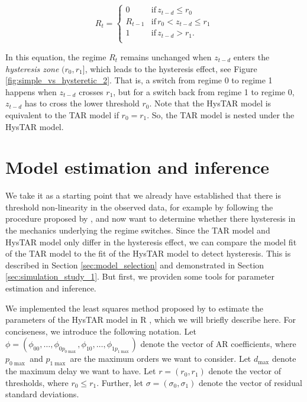 \documentclass{article}
\begin{document}
\begin{equation} \label{eqn:hysteretic_switching}
R_t = \begin{cases}
0 & \mathrm{if} \, z_{t-d} \le r_0 \\
R_{t-1} & \mathrm{if} \, r_0 < z_{t-d} \le r_1 \\
1 & \mathrm{if} \, z_{t-d} > r_1. \\
\end{cases}
\end{equation}

In this equation, the regime $R_t$ remains unchanged when $z_{t-d}$ enters the \textit{hysteresis zone} $(r_0, r_1]$, which leads to the hysteresis effect, see Figure \ref{fig:simple_vs_hysteretic_2}. 
That is, a switch from regime 0 to regime 1 happens when $z_{t-d}$ crosses $r_1$, but for a switch back from regime 1 to regime 0, $z_{t-d}$ has to cross the lower threshold $r_0$.
Note that the HysTAR model is equivalent to the TAR model if $r_0 = r_1$. So, the TAR model is nested under the HysTAR model.

\section{Model estimation and inference}
\label{sec:LS_estimation}
We take it as a starting point that we already have established that there is threshold non-linearity in the observed data, for example by following the procedure proposed by \citet{testing_for_threshold_nonlinearity}, and now want to determine whether there hysteresis in the mechanics underlying the regime switches.
Since the TAR model and HysTAR model only differ in the hysteresis effect, we can compare the model fit of the TAR model to the fit of the HysTAR model to detect hysteresis. This is described in Section \ref{sec:model_selection} and demonstrated in Section \ref{sec:simulation_study_1}.
But first, we providen some tools for parameter estimation and inference.

We implemented the least squares method proposed by \citet{bar2} to estimate the parameters of the HysTAR model in \textsf{R} \citep{R, R_hystar}, which we will briefly describe here.
For conciseness, we introduce the following notation.
Let $\phi = (\phi_{00}, \dots, \phi_{0 p_{0\max}}, \phi_{10}, \dots, \phi_{1 p_{1\max}})$ denote the  vector of AR coefficients, where $p_{0\max}$ and $p_{1\max}$ are the maximum orders we want to consider.
Let $d_{\max}$ denote the maximum delay we want to have.
Let $r = (r_0, r_1)$ denote the vector of thresholds, where $r_0 \le r_1$.
Further, let $\sigma = (\sigma_{0}, \sigma_{1})$ denote the  vector of residual standard deviations.
\end{document}
